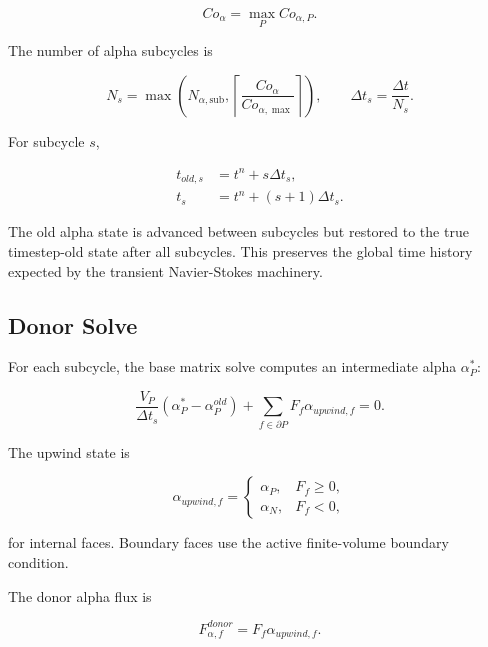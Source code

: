 \documentclass[11pt]{article}
\begin{document}
\begin{equation}
  Co_\alpha=\max_P Co_{\alpha,P}.
\end{equation}

The number of alpha subcycles is

\begin{equation}
  N_s
  =
  \max
  \left(
    N_{\alpha,\mathrm{sub}},
    \left\lceil
      \frac{Co_\alpha}{Co_{\alpha,\max}}
    \right\rceil
  \right),
  \qquad
  \Delta t_s=\frac{\Delta t}{N_s}.
  \label{eq:subcycles}
\end{equation}

For subcycle \(s\),

\begin{align}
  t_{old,s}&=t^n+s\Delta t_s,\\
  t_s&=t^n+(s+1)\Delta t_s.
\end{align}

The old alpha state is advanced between subcycles but restored to the true
timestep-old state after all subcycles.  This preserves the global time
history expected by the transient Navier-Stokes machinery.

\subsection{Donor Solve}

For each subcycle, the base matrix solve computes an intermediate alpha
\(\alpha_P^*\):

\begin{equation}
  \frac{V_P}{\Delta t_s}
  \left(\alpha_P^*-\alpha_P^{old}\right)
  +
  \sum_{f\in\partial P}
  F_f\alpha_{upwind,f}
  =
  0.
  \label{eq:alpha-donor}
\end{equation}

The upwind state is

\begin{equation}
  \alpha_{upwind,f}
  =
  \begin{cases}
    \alpha_P, & F_f\ge 0,\\
    \alpha_N, & F_f<0,
  \end{cases}
  \label{eq:upwind-alpha}
\end{equation}

for internal faces.  Boundary faces use the active finite-volume boundary
condition.

The donor alpha flux is

\begin{equation}
  F_{\alpha,f}^{donor}=F_f\alpha_{upwind,f}.
  \label{eq:donor-flux}
\end{equation}
\end{document}
